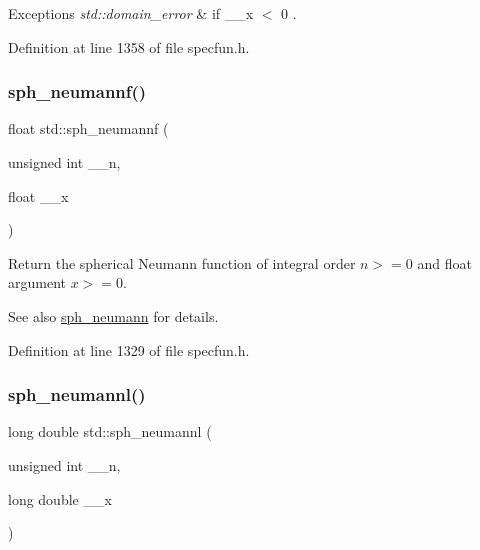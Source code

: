 \begin{DoxyExceptions}{Exceptions}
{\em std\+::domain\+\_\+error} & if {\ttfamily  \+\_\+\+\_\+x $<$ 0 }. \\
\hline
\end{DoxyExceptions}


Definition at line 1358 of file specfun.\+h.

\mbox{\label{group__tr29124__math__spec__func_ga789143122fa99536329bc2d1b1aac2f0}} 
\subsubsection{\texorpdfstring{sph\+\_\+neumannf()}{sph\_neumannf()}}
{\footnotesize\ttfamily float std\+::sph\+\_\+neumannf (\begin{DoxyParamCaption}\item[{unsigned int}]{\+\_\+\+\_\+n,  }\item[{float}]{\+\_\+\+\_\+x }\end{DoxyParamCaption})\hspace{0.3cm}{\ttfamily [inline]}}

Return the spherical Neumann function of integral order $ n >= 0 $ and {\ttfamily float} argument $ x >= 0 $.

\begin{DoxySeeAlso}{See also}
\hyperlink{group__tr29124__math__spec__func_gae8528a53bb38d600c6c517a7ec10039e}{sph\+\_\+neumann} for details. 
\end{DoxySeeAlso}


Definition at line 1329 of file specfun.\+h.

\mbox{\label{group__tr29124__math__spec__func_ga3cededa9b6e4601f190c3811e6aabfd6}} 
\subsubsection{\texorpdfstring{sph\+\_\+neumannl()}{sph\_neumannl()}}
{\footnotesize\ttfamily long double std\+::sph\+\_\+neumannl (\begin{DoxyParamCaption}\item[{unsigned int}]{\+\_\+\+\_\+n,  }\item[{long double}]{\+\_\+\+\_\+x }\end{DoxyParamCaption})\hspace{0.3cm}{\ttfamily [inline]}}

